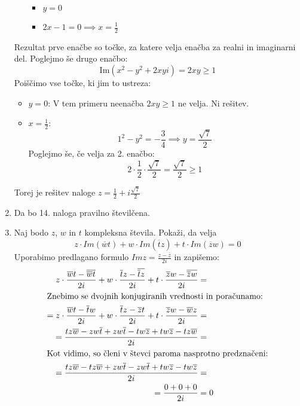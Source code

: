 \documentclass[12pt,a4paper,slovene]{article}
\begin{document}
\begin{enumerate}[(1)]
\begin{itemize}
        \begin{itemize}
            \item $y = 0$
            \item $2x  - 1 = 0 \implies x = \frac{1}{2}$
        \end{itemize}
    \end{itemize}
    Rezultat prve enačbe so točke, za katere velja enačba za realni in imaginarni del. Poglejmo še drugo enačbo:
    \[
    \text{Im}(x^2 - y^2 + 2xyi) = 2xy \geq 1
    \]
    Poiščimo vse točke, ki jim to ustreza:
    \begin{itemize}
        \item $y = 0$: V tem primeru neenačba $2xy \geq 1$ ne velja. Ni rešitev.
        \item $x = \frac{1}{2}$:
        \[
        1^2 - y^2 = -\frac{3}{4} \implies y = \frac{\sqrt{7}}{2}
        \]
        Poglejmo še, če velja za 2. enačbo:
        \[
        2 \cdot \frac{1}{2} \cdot \frac{\sqrt{7}}{2} = \frac{\sqrt{7}}{2} \geq 1
        \]
    \end{itemize}
    Torej je rešitev naloge $z = \frac{1}{2} + i \frac{\sqrt{7}}{2} $

\item
	Da bo 14. naloga pravilno številčena.

\item
Naj bodo $z$, $w$ in $t$ kompleksna števila. Pokaži, da velja 
	\[
    	z\cdot Im(\overline{w}t) + w\cdot Im(\overline{t}z) + t\cdot Im(\overline{z}w) = 0
    \]
    Uporabimo predlagano formulo $Im z = \frac{z-\overline{z}}{2i}$ in zapišemo:
    \begin{align*}
    	z\cdot\frac{\overline{w}t - \overline{\overline{w}t}}{2i} + w\cdot\frac{\overline{t}z - 	\overline{\overline{t}z}}{2i} + t\cdot\frac{\overline{z}w - \overline{\overline{z}w}}{2i} &=  \\
        \intertext{Znebimo se dvojnih konjugiranih vrednosti in poračunamo:}
        =z\cdot\frac{\overline{w}t - \overline{t}w}{2i} + w\cdot\frac{\overline{t}z - \overline{z}t}{2i} + t\cdot\frac{\overline{z}w - \overline{w}z}{2i} &=  \\
        =\frac{tz\overline{w} - zw\overline{t} + zw\overline{t} - tw\overline{z} + tw\overline{z} - tz\overline{w}}{2i} &=  \\
        \intertext{Kot vidimo, so členi v števci paroma nasprotno predznačeni:}
        =\frac{tz\overline{w} - tz\overline{w} + zw\overline{t} - zw\overline{t} + tw\overline{z} - tw\overline{z}}{2i} &=  \\
        =\frac{0+0+0}{2i} &= 0
    \end{align*}


\end{enumerate}
\end{document}
